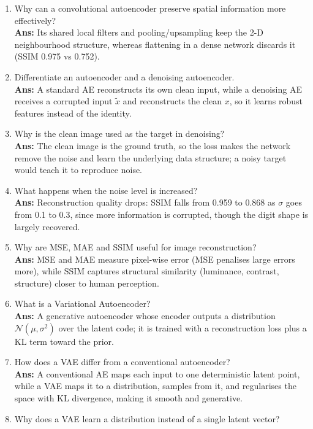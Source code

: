 \documentclass[10pt]{article}
\begin{document}
\begin{enumerate}
\textbf{Ans:} Reconstruction improves (MSE 0.0477 $\to$ 0.0210 from $d_z=2$ to 16) and then flattens (0.0215 at 32), while compression gets weaker and the model may drift toward copying the input.
\item Why can a convolutional autoencoder preserve spatial information more effectively?\\
\textbf{Ans:} Its shared local filters and pooling/upsampling keep the 2-D neighbourhood structure, whereas flattening in a dense network discards it (SSIM 0.975 vs 0.752).
\item Differentiate an autoencoder and a denoising autoencoder.\\
\textbf{Ans:} A standard AE reconstructs its own clean input, while a denoising AE receives a corrupted input $\tilde{x}$ and reconstructs the clean $x$, so it learns robust features instead of the identity.
\item Why is the clean image used as the target in denoising?\\
\textbf{Ans:} The clean image is the ground truth, so the loss makes the network remove the noise and learn the underlying data structure; a noisy target would teach it to reproduce noise.
\item What happens when the noise level is increased?\\
\textbf{Ans:} Reconstruction quality drops: SSIM falls from 0.959 to 0.868 as $\sigma$ goes from 0.1 to 0.3, since more information is corrupted, though the digit shape is largely recovered.
\item Why are MSE, MAE and SSIM useful for image reconstruction?\\
\textbf{Ans:} MSE and MAE measure pixel-wise error (MSE penalises large errors more), while SSIM captures structural similarity (luminance, contrast, structure) closer to human perception.
\item What is a Variational Autoencoder?\\
\textbf{Ans:} A generative autoencoder whose encoder outputs a distribution $\mathcal{N}(\mu,\sigma^2)$ over the latent code; it is trained with a reconstruction loss plus a KL term toward the prior.
\item How does a VAE differ from a conventional autoencoder?\\
\textbf{Ans:} A conventional AE maps each input to one deterministic latent point, while a VAE maps it to a distribution, samples from it, and regularises the space with KL divergence, making it smooth and generative.
\item Why does a VAE learn a distribution instead of a single latent vector?\\

\end{enumerate}
\end{document}
